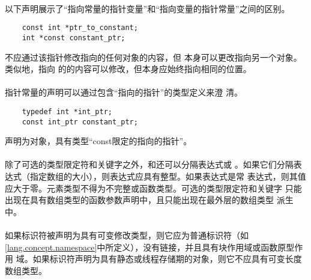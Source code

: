 \paragraph{}
\ex* 以下声明展示了``指向常量的指针变量''和``指向变量的指针常量''之间的区别。
\begin{lstlisting}
    const int *ptr_to_constant;
    int *const constant_ptr;
\end{lstlisting}
不应通过该指针修改指向的任何对象的内容，但
本身可以更改指向另一个对象。类似地，指向
的的内容可以修改，但本身应始终指向相同的位置。

\paragraph{}
指针常量的声明可以通过包含``指向的指针''的类型定义来澄
清。
\begin{lstlisting}
    typedef int *int_ptr;
    const int_ptr constant_ptr;
\end{lstlisting}
声明为对象，具有类型``const限定的指向的指针''。

\constraint
\paragraph{}
除了可选的类型限定符和关键字之外，\tm{[}和\tm{]}还可以分隔表达式或
\tm{*}。如果它们分隔表达式（指定数组的大小），则表达式应具有整型。如果表达式是常
表达式，则其值应大于零。元素类型不得为不完整或函数类型。可选的类型限定符和关键字
只能出现在具有数组类型的函数参数声明中，且只能出现在最外层的数组类型
派生中。

\paragraph{}
如果标识符被声明为具有可变修改类型，则它应为普通标识符（如
\ref{lang.concept.namespace}中所定义），没有链接，并且具有块作用域或函数原型作用
域。如果标识符声明为具有静态或线程存储期的对象，则它不应具有可变长度数组类型。

\semantic
